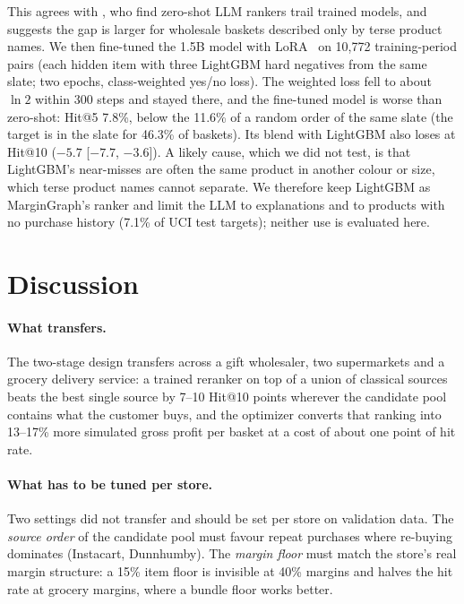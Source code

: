\documentclass[11pt]{article}
\begin{document}
This agrees with \citet{hou2024zeroshot}, who find zero-shot LLM rankers trail trained models, and suggests the gap is larger for wholesale baskets described only by terse product names.
We then fine-tuned the 1.5B model with LoRA~\citep{hu2022lora,bao2023tallrec} on 10,772 training-period pairs (each hidden item with three LightGBM hard negatives from the same slate; two epochs, class-weighted yes/no loss).
The weighted loss fell to about $\ln 2$ within 300 steps and stayed there, and the fine-tuned model is worse than zero-shot: Hit@5 7.8\%, below the 11.6\% of a random order of the same slate (the target is in the slate for 46.3\% of baskets).
Its blend with LightGBM also loses at Hit@10 ($-5.7$ [$-7.7$, $-3.6$]).
A likely cause, which we did not test, is that LightGBM's near-misses are often the same product in another colour or size, which terse product names cannot separate.
We therefore keep LightGBM as MarginGraph's ranker and limit the LLM to explanations and to products with no purchase history (7.1\% of UCI test targets); neither use is evaluated here.

\section{Discussion}

\paragraph{What transfers.}
The two-stage design transfers across a gift wholesaler, two supermarkets and a grocery delivery service: a trained reranker on top of a union of classical sources beats the best single source by 7--10 Hit@10 points wherever the candidate pool contains what the customer buys, and the optimizer converts that ranking into 13--17\% more simulated gross profit per basket at a cost of about one point of hit rate.

\paragraph{What has to be tuned per store.}
Two settings did not transfer and should be set per store on validation data.
The \emph{source order} of the candidate pool must favour repeat purchases where re-buying dominates (Instacart, Dunnhumby).
The \emph{margin floor} must match the store's real margin structure: a 15\% item floor is invisible at 40\% margins and halves the hit rate at grocery margins, where a bundle floor works better.
\end{document}
